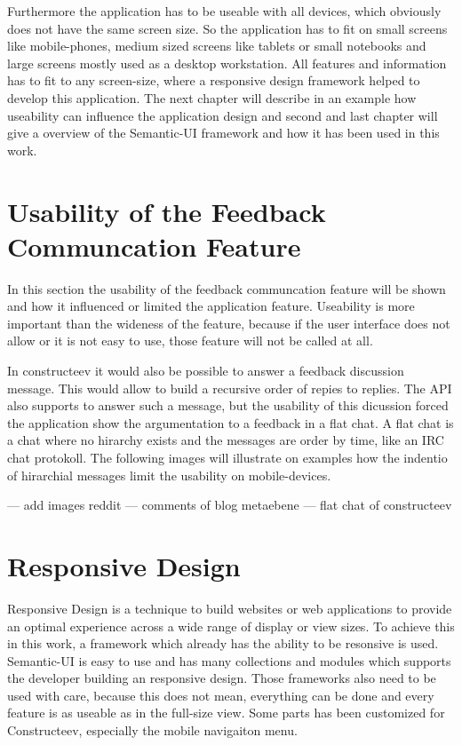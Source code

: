 Furthermore the application has to be useable with all devices, which obviously does not have the same screen size. So the application has to fit on small screens like mobile-phones, medium sized screens like tablets or small notebooks and large screens mostly used as a desktop workstation. All features and information has to fit to any screen-size, where a responsive design framework helped to develop this application. The next chapter will describe in an example how useability can influence the application design and second and last chapter will give a overview of the Semantic-UI framework and how it has been used in this work. 

\section{Usability of the Feedback Communcation Feature}
In this section the usability of the feedback communcation feature will be shown and how it influenced or limited the application feature. Useability is more important than the wideness of the feature, because if the user interface does not allow or it is not easy to use, those feature will not be called at all.  

In constructeev it would also be possible to answer a feedback discussion message. This would allow to build a recursive order of repies to replies. The API also supports to answer such a message, but the usability of this dicussion forced the application show the argumentation to a feedback in a flat chat. A flat chat is a chat where no hirarchy exists and the messages are order by time, like an IRC chat protokoll.  \cite{RFC1459} The following images will illustrate on examples how the indentio of hirarchial messages limit the usability on mobile-devices.

--- add images reddit --- comments of blog metaebene --- flat chat of constructeev %
\section{Responsive Design}
Responsive Design is a technique to build websites or web applications to provide an optimal experience across a wide range of display or view sizes. To achieve this in this work, a framework which already has the ability to be resonsive is used. Semantic-UI is easy to use and has many collections and modules which supports the developer building an  responsive design. Those frameworks also need to be used with care, because this does not mean, everything can be done and every feature is as useable as in the full-size view. Some parts has been customized for Constructeev, especially the mobile navigaiton menu.

